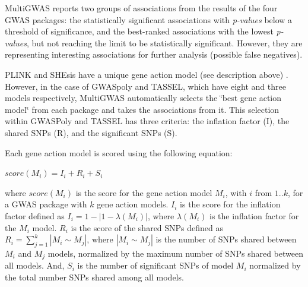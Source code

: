 \documentclass{article}
\begin{document}
MultiGWAS reports two groups of associations from the results of the four GWAS packages: the statistically significant associations with \emph{p-values} below a threshold of significance, and the best-ranked associations with the lowest \emph{p-values}, but not reaching the limit to be statistically significant. However, they are representing interesting associations for further analysis (possible false negatives).

PLINK and SHEsis have a unique gene action model (see description above) . However, in the case of GWASpoly and TASSEL, which have eight and three models respectively, MultiGWAS automatically selects the \char`\"{}best gene action model\char`\"{} from each package and takes the associations from it. This selection within GWASPoly and TASSEL has three criteria: the inflation factor (I), the shared SNPs (R), and the significant SNPs (S).

Each gene action model is scored using the following equation: 
\begin{center}
$score(M_{i})=I{}_{i}+R_{i}+S{}_{i}$
\par\end{center}

where $score(M_{i})$ is the score for the gene action model $M_{i}$, with $i$ from $1..k$, for a GWAS package with $k$ gene action models. $I_{i}$ is the score for the inflation factor defined as $I_{i}=1-|1-\lambda(M_{i})|$, where $\lambda(M_{i})$ is the inflation factor for the $M_{i}$ model. $R_{i}$ is the score of the shared SNPs defined as $R_{i}=\sum\limits _{j=1}^{k}{\textstyle |M_{i}\sim M_{j}|}$, where ${\textstyle |M_{i}\sim M_{j}|}$ is the number of SNPs shared between $M_{i}$ and $M_{j}$ models, normalized by the maximum number of SNPs shared between all models. And, $S_{i}$ is the number of significant SNPs of model $M_{i}$ normalized by the total number SNPs shared among all models.

\end{document}
